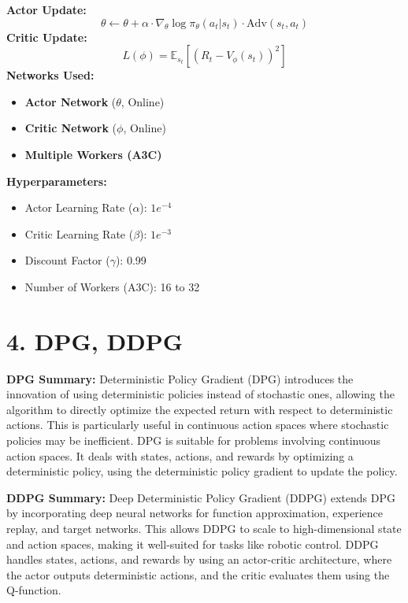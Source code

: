 \documentclass[a4paper,10pt]{article}
\begin{document}
\begin{multicols}{2}
\textbf{Actor Update:}
\[
\theta \leftarrow \theta + \alpha \cdot \nabla_\theta \log \pi_\theta(a_t | s_t) \cdot \text{Adv}(s_t, a_t)
\]
\textbf{Critic Update:}
\[
L(\phi) = \mathbb{E}_{s_t} \left[ \left( R_t - V_\phi(s_t) \right)^2 \right]
\]
\textbf{Networks Used:}
\begin{itemize}
    \item \textbf{Actor Network} (\(\theta\), Online)
    \item \textbf{Critic Network} (\(\phi\), Online)
    \item \textbf{Multiple Workers (A3C)}
\end{itemize}
\textbf{Hyperparameters:}
\begin{itemize}
    \item Actor Learning Rate (\(\alpha\)): \(1e^{-4}\)
    \item Critic Learning Rate (\(\beta\)): \(1e^{-3}\)
    \item Discount Factor (\(\gamma\)): 0.99
    \item Number of Workers (A3C): 16 to 32
\end{itemize}

\section*{4. DPG, DDPG}
\textbf{DPG Summary:} Deterministic Policy Gradient (DPG) introduces the innovation of using deterministic policies instead of stochastic ones, allowing the algorithm to directly optimize the expected return with respect to deterministic actions. This is particularly useful in continuous action spaces where stochastic policies may be inefficient. DPG is suitable for problems involving continuous action spaces. It deals with states, actions, and rewards by optimizing a deterministic policy, using the deterministic policy gradient to update the policy.

\textbf{DDPG Summary:} Deep Deterministic Policy Gradient (DDPG) extends DPG by incorporating deep neural networks for function approximation, experience replay, and target networks. This allows DDPG to scale to high-dimensional state and action spaces, making it well-suited for tasks like robotic control. DDPG handles states, actions, and rewards by using an actor-critic architecture, where the actor outputs deterministic actions, and the critic evaluates them using the Q-function.


\end{multicols}
\end{document}
